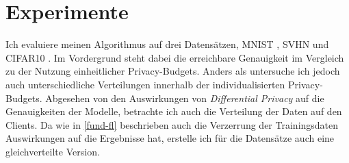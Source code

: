 \chapter{Experimente}\label{chap:experiments}

Ich evaluiere meinen Algorithmus auf drei Datensätzen, MNIST \cite{lecun:1998}, SVHN \cite{netzer:2011} und CIFAR10 \cite{krizhevsky:2009}. Im Vordergrund steht dabei die erreichbare Genauigkeit im Vergleich zu der Nutzung einheitlicher Privacy-Budgets. Anders als \textcite{aldaghri:2023} untersuche ich jedoch auch unterschiedliche Verteilungen innerhalb der individualisierten Privacy-Budgets. Abgesehen von den Auswirkungen von \textit{Differential Privacy} auf die Genauigkeiten der Modelle, betrachte ich auch die Verteilung der Daten auf den Clients. Da wie in \autoref{fund-fl} beschrieben auch die Verzerrung der Trainingsdaten Auswirkungen auf die Ergebnisse hat, erstelle ich für die Datensätze auch eine gleichverteilte Version.

